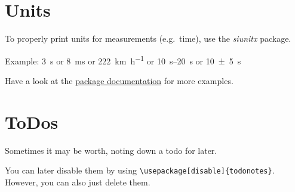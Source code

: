 \section{Units}
To properly print units for measurements (e.g.\ time), use the \textit{siunitx} package.

Example: \qty{3}{\second} or \qty{8}{\milli\second} or \qty{222}{\kilo\metre\per\hour} or \qtyrange{10}{20}{\second} or \qty{10\pm 5}{\second}

Have a look at the \href{https://ctan.org/pkg/siunitx?lang=de}{package documentation} for more examples.

\section{ToDos}
Sometimes it may be worth, noting down a todo for later.

You can later disable them by using \verb|\usepackage[disable]{todonotes}|.
However, you can also just delete them.
